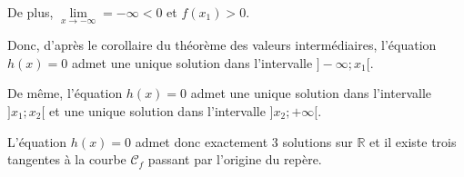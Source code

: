 \documentclass[10pt]{article}
\providecommand{\R}{\mathbb{R}}
\begin{document}
\begin{enumerate}
		De plus, $\lim\limits_{x\to -\infty } = -\infty <0 $ et $f(x_1)>0$.

		Donc, d'après le corollaire du théorème des valeurs intermédiaires, l'équation $h(x) = 0$ admet une unique solution dans l'intervalle $]-\infty ; x_1[$.

		\medskip

		De même, l'équation $h(x) = 0$ admet une unique solution dans l'intervalle $]x_1 ; x_2[$
		et une unique solution dans l'intervalle $]x_2 ; +\infty[$.

		L'équation $h(x)=0$ admet donc exactement 3 solutions sur $\R$ et il existe trois tangentes à la courbe $\mathcal{C}_f$ passant par l'origine du repère.

	\end{enumerate}
\end{document}
